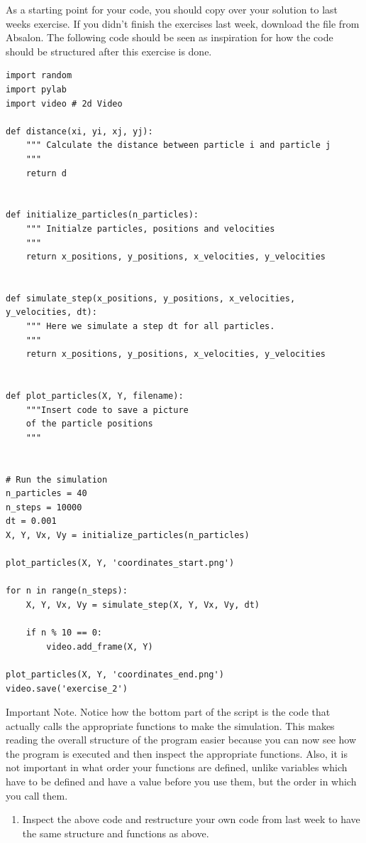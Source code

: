 \documentclass{article}
\begin{document}
As a starting point for your code, you should copy over your solution to last
weeks exercise. If you didn't finish the exercises last week, download the file
 from Absalon. The following code should be seen as
inspiration for how the code should be structured after this exercise is done.

\begin{lstlisting}
import random
import pylab
import video # 2d Video

def distance(xi, yi, xj, yj):
    """ Calculate the distance between particle i and particle j
    """
    return d


def initialize_particles(n_particles):
    """ Initialze particles, positions and velocities
    """
    return x_positions, y_positions, x_velocities, y_velocities


def simulate_step(x_positions, y_positions, x_velocities, y_velocities, dt):
    """ Here we simulate a step dt for all particles.
    """
    return x_positions, y_positions, x_velocities, y_velocities


def plot_particles(X, Y, filename):
    """Insert code to save a picture
    of the particle positions
    """


# Run the simulation
n_particles = 40
n_steps = 10000
dt = 0.001
X, Y, Vx, Vy = initialize_particles(n_particles)

plot_particles(X, Y, 'coordinates_start.png')

for n in range(n_steps):
    X, Y, Vx, Vy = simulate_step(X, Y, Vx, Vy, dt)

    if n % 10 == 0:
        video.add_frame(X, Y)

plot_particles(X, Y, 'coordinates_end.png')
video.save('exercise_2')

\end{lstlisting}

\newpage
Important Note.
Notice how the bottom part of the script is the code that actually calls the
appropriate functions to make the simulation.  This makes reading the overall
structure of the program easier because you can now see how the program is
executed and then inspect the appropriate functions.  Also, it is not important
in what order your functions are defined, unlike variables which have to be
defined and have a value before you use them, but the order in which you
call them.

\begin{enumerate}
  \setcounter{enumi}{0}
  \item Inspect the above code and restructure your own code from last week to have the
    same structure and functions as above.
\end{enumerate}
\end{document}
